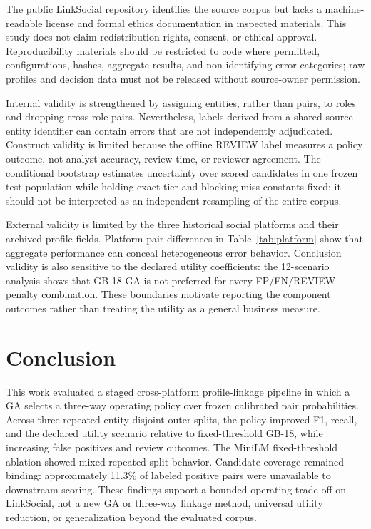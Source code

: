 \documentclass[conference]{IEEEtran}
\begin{document}
The public LinkSocial repository identifies the source corpus but lacks a machine-readable license and formal ethics documentation in inspected materials. This study does not claim redistribution rights, consent, or ethical approval. Reproducibility materials should be restricted to code where permitted, configurations, hashes, aggregate results, and non-identifying error categories; raw profiles and decision data must not be released without source-owner permission.

Internal validity is strengthened by assigning entities, rather than pairs, to roles and dropping cross-role pairs. Nevertheless, labels derived from a shared source entity identifier can contain errors that are not independently adjudicated. Construct validity is limited because the offline REVIEW label measures a policy outcome, not analyst accuracy, review time, or reviewer agreement. The conditional bootstrap estimates uncertainty over scored candidates in one frozen test population while holding exact-tier and blocking-miss constants fixed; it should not be interpreted as an independent resampling of the entire corpus.

External validity is limited by the three historical social platforms and their archived profile fields. Platform-pair differences in Table~\ref{tab:platform} show that aggregate performance can conceal heterogeneous error behavior. Conclusion validity is also sensitive to the declared utility coefficients: the 12-scenario analysis shows that GB-18-GA is not preferred for every FP/FN/REVIEW penalty combination. These boundaries motivate reporting the component outcomes rather than treating the utility as a general business measure.

\section{Conclusion}
This work evaluated a staged cross-platform profile-linkage pipeline in which a GA selects a three-way operating policy over frozen calibrated pair probabilities. Across three repeated entity-disjoint outer splits, the policy improved F1, recall, and the declared utility scenario relative to fixed-threshold GB-18, while increasing false positives and review outcomes. The MiniLM fixed-threshold ablation showed mixed repeated-split behavior. Candidate coverage remained binding: approximately 11.3\% of labeled positive pairs were unavailable to downstream scoring. These findings support a bounded operating trade-off on LinkSocial, not a new GA or three-way linkage method, universal utility reduction, or generalization beyond the evaluated corpus.



\end{document}
